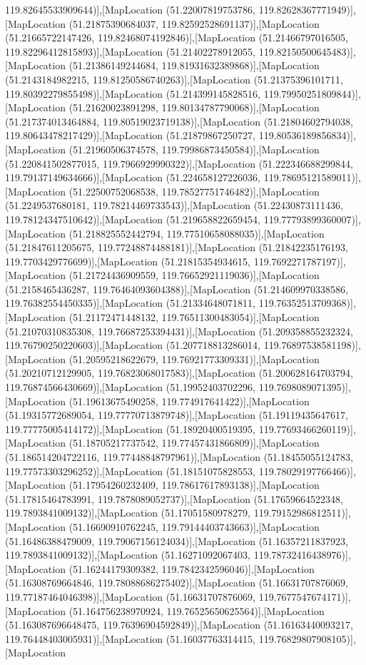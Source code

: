 119.82645533909644)],[MapLocation (51.22007819753786, 119.82628367771949)],[MapLocation (51.21875390684037, 119.82592528691137)],[MapLocation (51.21665722147426, 119.82468074192846)],[MapLocation (51.21466797016505, 119.82296412815893)],[MapLocation (51.21402278912055, 119.82150500645483)],[MapLocation (51.21386149244684, 119.81931632389868)],[MapLocation (51.2143184982215, 119.81250586740263)],[MapLocation (51.21375396101711, 119.80392279855498)],[MapLocation (51.214399145828516, 119.79950251809844)],[MapLocation (51.21620023891298, 119.80134787790068)],[MapLocation (51.217374013464884, 119.80519023719138)],[MapLocation (51.21804602794038, 119.80643478217429)],[MapLocation (51.21879867250727, 119.80536189856834)],[MapLocation (51.21960506374578, 119.79986873450584)],[MapLocation (51.220841502877015, 119.7966929990322)],[MapLocation (51.222346688299844, 119.79137149634666)],[MapLocation (51.224658127226036, 119.78695121589011)],[MapLocation (51.22500752068538, 119.78527751746482)],[MapLocation (51.2249537680181, 119.78214469733543)],[MapLocation (51.22430873111436, 119.78124347510642)],[MapLocation (51.219658822659454, 119.77793899360007)],[MapLocation (51.218825552442794, 119.77510658088035)],[MapLocation (51.21847611205675, 119.77248874488181)],[MapLocation (51.21842235176193, 119.7703429776699)],[MapLocation (51.21815354934615, 119.7692271787197)],[MapLocation (51.21724436909559, 119.76652921119036)],[MapLocation (51.2158465436287, 119.76464093604388)],[MapLocation (51.214609970338586, 119.76382554450335)],[MapLocation (51.21334648071811, 119.76352513709368)],[MapLocation (51.21172471448132, 119.76511300483054)],[MapLocation (51.21070310835308, 119.76687253394431)],[MapLocation (51.209358855232324, 119.76790250220603)],[MapLocation (51.207718813286014, 119.76897538581198)],[MapLocation (51.20595218622679, 119.76921773309331)],[MapLocation (51.20210712129905, 119.76823068017583)],[MapLocation (51.200628164703794, 119.76874566430669)],[MapLocation (51.19952403702296, 119.7698089071395)],[MapLocation (51.19613675490258, 119.774917641422)],[MapLocation (51.19315772689054, 119.77770713879748)],[MapLocation (51.19119435647617, 119.77775005414172)],[MapLocation (51.18920400519395, 119.77693466260119)],[MapLocation (51.18705217737542, 119.77457431866809)],[MapLocation (51.186514204722116, 119.77448848797961)],[MapLocation (51.18455055124783, 119.77573303296252)],[MapLocation (51.18151075828553, 119.78029197766466)],[MapLocation (51.17954260232409, 119.78617617893138)],[MapLocation (51.17815464783991, 119.7878089052737)],[MapLocation (51.17659664522348, 119.7893841009132)],[MapLocation (51.17051580978279, 119.79152986812511)],[MapLocation (51.16690910762245, 119.79144403743663)],[MapLocation (51.16486388479009, 119.79067156124034)],[MapLocation (51.16357211837923, 119.7893841009132)],[MapLocation (51.16271092067403, 119.78732416438976)],[MapLocation (51.16244179309382, 119.7842342596046)],[MapLocation (51.16308769664846, 119.78088686275402)],[MapLocation (51.16631707876069, 119.77187464046398)],[MapLocation (51.16631707876069, 119.7677547674171)],[MapLocation (51.164756238970924, 119.76525650625564)],[MapLocation (51.163087696648475, 119.76396904592849)],[MapLocation (51.16163440093217, 119.76448403005931)],[MapLocation (51.16037763314415, 119.76829807908105)],[MapLocation 